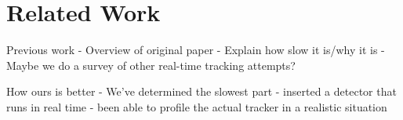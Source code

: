 \section{Related Work}
\label{sec:related}


Previous work
- Overview of original paper
- Explain how slow it is/why it is
- Maybe we do a survey of other real-time tracking attempts?

How ours is better
- We've determined the slowest part
- inserted a detector that runs in real time
- been able to profile the actual tracker in a realistic situation